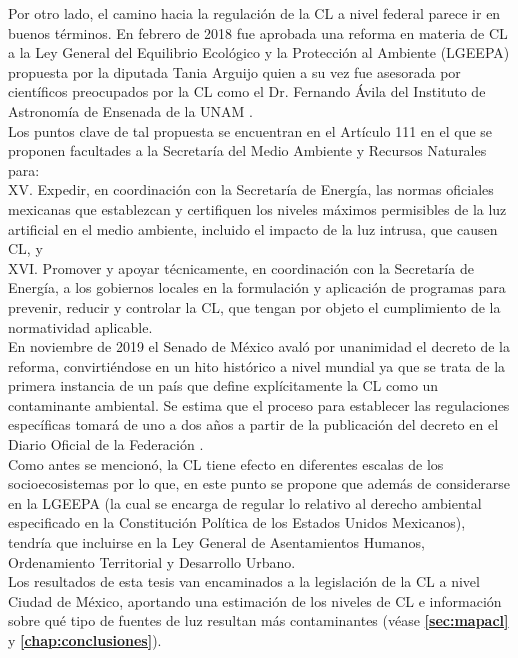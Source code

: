 Por otro lado, el camino hacia la regulación de la CL a nivel federal parece ir en buenos términos. En febrero de 2018 fue aprobada una reforma en materia de CL a la Ley General del Equilibrio Ecológico y la Protección al Ambiente (LGEEPA) propuesta por  la diputada Tania Arguijo quien a su vez fue asesorada por científicos preocupados por la CL como el Dr. Fernando Ávila del Instituto de Astronomía de Ensenada de la UNAM \citep{Arguijo2018,LGEEPA2018}.\\

Los puntos clave de tal propuesta se encuentran en el Artículo 111 en el que se proponen facultades a la Secretaría del Medio Ambiente y Recursos Naturales para:\\

XV. Expedir, en coordinación con la Secretaría de Energía, las normas oficiales mexicanas que establezcan y certifiquen los niveles máximos permisibles de la luz artificial en el medio ambiente, incluido el impacto de la luz intrusa, que causen CL, y\\

XVI. Promover y apoyar técnicamente, en coordinación con la Secretaría de Energía, a los gobiernos locales en la formulación y aplicación de programas para prevenir, reducir y controlar la CL, que tengan por objeto el cumplimiento de la normatividad aplicable.\\

En noviembre de 2019 el Senado de México avaló por unanimidad el decreto de la reforma, convirtiéndose en un hito histórico a nivel mundial ya que se trata de la primera instancia de un país que define explícitamente la CL como un contaminante ambiental. Se estima que el proceso para establecer las regulaciones específicas tomará de uno a dos años a partir de la publicación del decreto en el Diario Oficial de la Federación \citep{IDA2019}.\\

Como antes se mencionó, la CL tiene efecto en diferentes escalas de los socioecosistemas por lo que, en este punto se propone que además de considerarse en la LGEEPA (la cual se encarga de regular lo relativo al derecho ambiental especificado en la Constitución Política de los Estados Unidos Mexicanos), tendría que incluirse en la Ley General de Asentamientos Humanos, Ordenamiento Territorial y Desarrollo Urbano.\\

Los resultados de esta tesis van encaminados a la legislación de la CL a nivel Ciudad de México, aportando una estimación de los niveles de CL e información sobre qué tipo de fuentes de luz resultan más contaminantes (véase \textbf{\autoref{sec:mapacl}} y \textbf{\autoref{chap:conclusiones}}).

